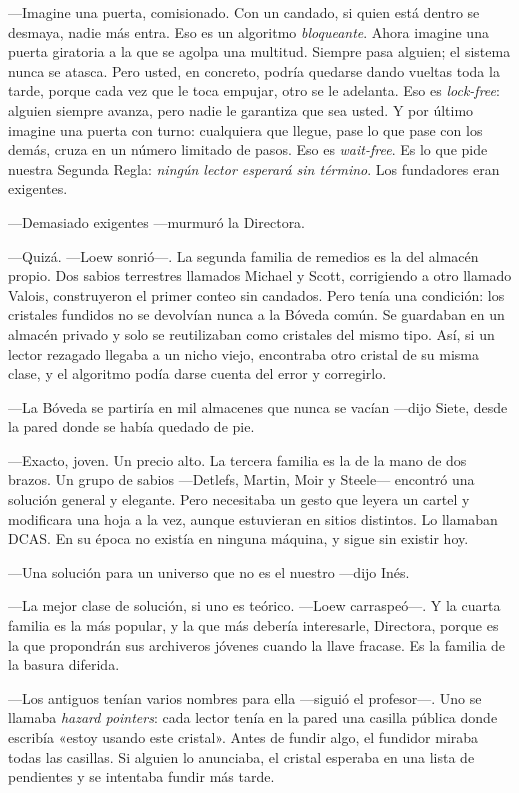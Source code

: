 ---Imagine una puerta, comisionado. Con un candado, si quien está dentro se desmaya, nadie más entra. Eso es un algoritmo \emph{bloqueante}. Ahora imagine una puerta giratoria a la que se agolpa una multitud. Siempre pasa alguien; el sistema nunca se atasca. Pero usted, en concreto, podría quedarse dando vueltas toda la tarde, porque cada vez que le toca empujar, otro se le adelanta. Eso es \emph{lock-free}: alguien siempre avanza, pero nadie le garantiza que sea usted. Y por último imagine una puerta con turno: cualquiera que llegue, pase lo que pase con los demás, cruza en un número limitado de pasos. Eso es \emph{wait-free}. Es lo que pide nuestra Segunda Regla: \emph{ningún lector esperará sin término}. Los fundadores eran exigentes.

---Demasiado exigentes ---murmuró la Directora.

---Quizá. ---Loew sonrió---\nobreak. La segunda familia de remedios es la del almacén propio. Dos sabios terrestres llamados Michael y Scott, corrigiendo a otro llamado Valois, construyeron el primer conteo sin candados. Pero tenía una condición: los cristales fundidos no se devolvían nunca a la Bóveda común. Se guardaban en un almacén privado y solo se reutilizaban como cristales del mismo tipo. Así, si un lector rezagado llegaba a un nicho viejo, encontraba otro cristal de su misma clase, y el algoritmo podía darse cuenta del error y corregirlo.

---La Bóveda se partiría en mil almacenes que nunca se vacían ---dijo Siete, desde la pared donde se había quedado de pie.

---Exacto, joven. Un precio alto. La tercera familia es la de la mano de dos brazos. Un grupo de sabios ---Detlefs, Martin, Moir y Steele--- encontró una solución general y elegante. Pero necesitaba un gesto que leyera un cartel y modificara una hoja a la vez, aunque estuvieran en sitios distintos. Lo llamaban DCAS. En su época no existía en ninguna máquina, y sigue sin existir hoy.

---Una solución para un universo que no es el nuestro ---dijo Inés.

---La mejor clase de solución, si uno es teórico. ---Loew carraspeó---\nobreak. Y la cuarta familia es la más popular, y la que más debería interesarle, Directora, porque es la que propondrán sus archiveros jóvenes cuando la llave fracase. Es la familia de la basura diferida.

\escena
---Los antiguos tenían varios nombres para ella ---siguió el profesor---\nobreak. Uno se llamaba \emph{hazard pointers}: cada lector tenía en la pared una casilla pública donde escribía «estoy usando este cristal». Antes de fundir algo, el fundidor miraba todas las casillas. Si alguien lo anunciaba, el cristal esperaba en una lista de pendientes y se intentaba fundir más tarde.

